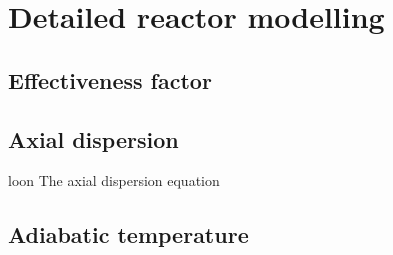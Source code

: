 \section{Detailed reactor modelling}
\subsection{Effectiveness factor}

\subsection{Axial dispersion}
loon
The axial dispersion equation
\subsection{Adiabatic temperature}
